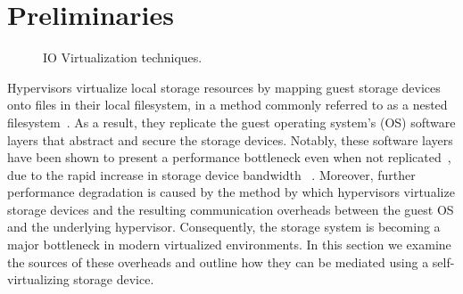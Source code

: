 
\chapter{Preliminaries}
\label{chap:prelims}
\begin{figure}[!ht]
  \centering
    \hfill
    \hfill
    \caption{IO Virtualization techniques.
      \label{fig:storage}}
    
\end{figure}


Hypervisors virtualize local storage resources by mapping guest storage devices onto files in their local filesystem, in a method commonly referred to as a nested filesystem~\cite{le12nested}. As a result, they replicate the guest operating system's (OS) software layers that abstract and secure the storage devices. Notably, these software layers have been shown to present a performance bottleneck even when not replicated~\cite{yu14swoverheads}, due to the rapid increase in storage device bandwidth ~\cite{intel-ssd,seagate16ssd}.
%
Moreover, further performance degradation is caused by the method by which hypervisors virtualize storage devices and the resulting communication overheads between the guest OS and the underlying hypervisor.
Consequently, the storage system is becoming a major bottleneck in modern virtualized environments.
%
In this section we examine the sources of these overheads and outline how they can be mediated using a self-virtualizing storage device.

